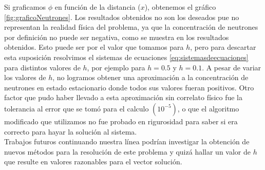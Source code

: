 \documentclass[11pt,a4paper]{emulateapj}
\begin{document}
Si graficamos $\phi$ en función de la distancia ($x$), obtenemos el gráfico \ref{fig:graficoNeutrones}. Los resultados obtenidos no son los deseados pue no representan la realidad física del problema, ya que la concentración de neutrones por definición no puede ser negativa, como se muestra en los resultados obtenidos. Esto puede ser por el valor que tomamos para $h$, pero para descartar esta suposición resolvimos el sistemas de ecuaciones \ref{eq:sistemasdeecuaciones} para distintos valores de $h$, por ejemplo para $h=0.5$ y $h=0.1$. A pesar de variar los valores de $h$, no logramos obtener una aproximación a la concentración de neutrones en estado estacionario donde todos sus valores fueran positivos.
Otro factor que pudo haber llevado a esta aproximación sin correlato físico fue la tolerancia al error que se tomó para el calculo $(10^{-5})$, o que el algoritmo modificado que utilizamos no fue probado en rigurosidad para saber si era correcto para hayar la solución al sistema. \\

Trabajos futuros continuando nuestra línea podrían investigar la obtención de nuevos métodos para la resolución de este problema y quizá hallar un valor de $h$ que resulte en valores razonables para el vector solución.

%
%

\end{document}
